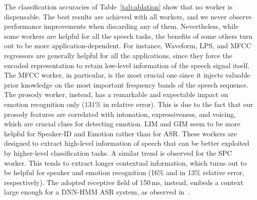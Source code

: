 \documentclass[a4paper]{article}
\begin{document}
The classification accuracies of Table~\ref{tab:ablation} show that no worker is dispensable. The best results are achieved with all workers, and we never observe performance improvements when discarding any of them. Nevertheless, while some workers are helpful for all the speech tasks, the benefits of some others turn out to be more application-dependent. For instance, Waveform, LPS, and MFCC regressors are generally helpful for all the applications, since they force the encoded representation to retain low-level information of the speech signal itself. The MFCC worker, in particular, is the most crucial one since it injects valuable prior knowledge on the most important frequency bands of the speech sequence. The prosody worker, instead, has a remarkable and expectable impact on emotion recognition only (131\% in relative error). This is due to the fact that our prosody features are correlated with intonation, expressiveness, and voicing, which are crucial clues for detecting emotion. LIM and GIM seem to be more helpful for Speaker-ID and Emotion rather than for ASR. These workers are designed to extract high-level information of speech that can be better exploited by higher-level classification tasks. A similar trend is observed for the SPC worker. This tends to extract longer contextual information, which turns out to be helpful for speaker and emotion recognition (16\% and in 13\% relative error, respectively). 
The adopted receptive field of 150\,ms, instead, embeds a context large enough for a DNN-HMM ASR system, as observed in~\cite{ravanelli_context}.
\end{document}
